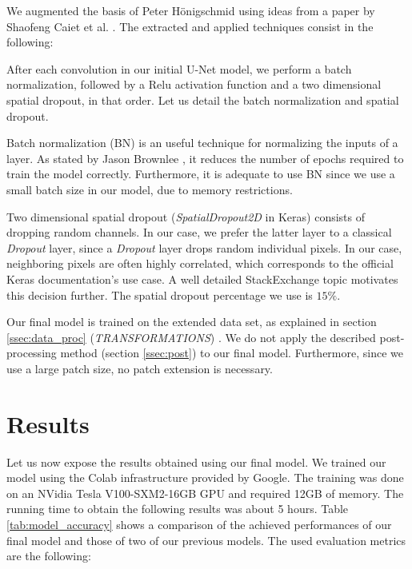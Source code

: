 \documentclass[10pt,conference,compsocconf]{IEEEtran}
\begin{document}
We augmented the basis of Peter Hönigschmid \cite{unet} using ideas from a paper by Shaofeng Caiet et al. \cite{final}. The extracted and applied techniques consist in the following:

After each convolution in our initial U-Net model, we perform a batch normalization, followed by a Relu activation function and a two dimensional spatial dropout, in that order. Let us detail the batch normalization and spatial dropout.

Batch normalization (BN) is an useful technique for normalizing the inputs of a layer. As stated by Jason Brownlee \cite{bn}, it reduces the number of epochs required to train the model correctly. Furthermore, it is adequate to use BN since we use a small batch size in our model, due to memory restrictions.

Two dimensional spatial dropout (\textit{SpatialDropout2D} in Keras) consists of dropping random channels. In our case, we prefer the latter layer to a classical \textit{Dropout} layer, since a \textit{Dropout} layer drops random individual pixels. In our case, neighboring pixels are often highly correlated, which corresponds to the official Keras documentation's \cite{keras} use case. A well detailed StackExchange topic \cite{stack} motivates this decision further. The spatial dropout percentage we use is $15\%$.

Our final model is trained on the extended data set, as explained in section \ref{ssec:data_proc} (\textit{TRANSFORMATIONS}) . We do not apply the described post-processing method (section \ref{ssec:post}) to our final model. Furthermore, since we use a large patch size, no patch extension is necessary.


\section{Results}
\label{sec:results}

Let us now expose the results obtained using our final model. We trained our model using the Colab infrastructure provided by Google. The training was done on an NVidia Tesla V100-SXM2-16GB GPU and required 12GB of memory. The running time to obtain the following results was about 5 hours. Table \ref{tab:model_accuracy} shows a comparison of the achieved performances of our final model and those of two of our previous models. The used evaluation metrics are the following:
\end{document}
